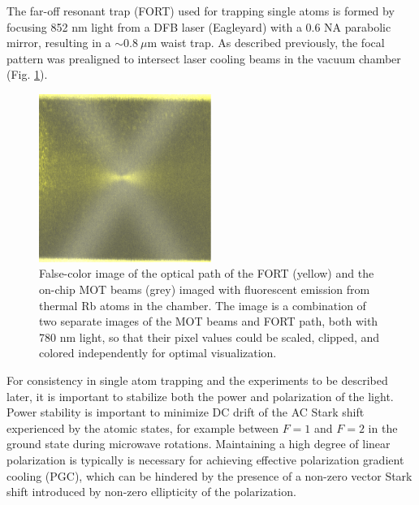 The far-off resonant trap (FORT) used for trapping single atoms is formed by focusing 852 nm light from a DFB laser (Eagleyard) with a 0.6 NA parabolic mirror, resulting in a $\sim0.8~\mu$m waist trap. As described previously, the focal pattern was prealigned to intersect laser cooling beams in the vacuum chamber (Fig. \ref{fig:parabolicfluorescence}).
\begin{figure}[!ht]
    \centering
    \includegraphics[width=0.5\textwidth]{Images/mirror_fluorescence_and_chip_beams_yellow.pdf}
    \caption{False-color image of the optical path of the FORT (yellow) and the on-chip MOT beams (grey) imaged with fluorescent emission from thermal Rb atoms in the chamber. The image is a combination of two separate images of the MOT beams and FORT path, both with 780 nm light, so that their pixel values could be scaled, clipped, and colored independently for optimal visualization.}
    \label{fig:parabolicfluorescence}
\end{figure}
For consistency in single atom trapping and the experiments to be described later, it is important to stabilize both the power and polarization of the light. Power stability is important to minimize DC drift of the AC Stark shift experienced by the atomic states, for example between $F=1$ and $F=2$ in the ground state during microwave rotations. Maintaining a high degree of linear polarization is typically is necessary for achieving effective polarization gradient cooling (PGC), which can be hindered by the presence of a non-zero vector Stark shift introduced by non-zero ellipticity of the polarization\cite{chin2017polarization}.

